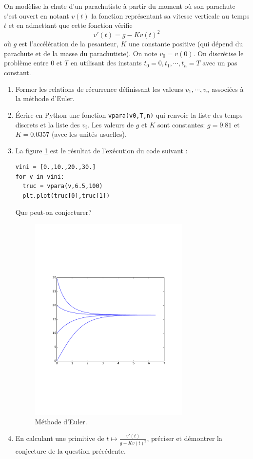 On modèlise la chute d'un parachutiste à partir du moment où son parachute s'est ouvert en notant $v(t)$ la fonction représentant sa vitesse verticale au temps $t$ et en admettant que cette fonction vérifie
\begin{displaymath}
  v'(t) = g - K v(t)^2
\end{displaymath}
où $g$ est l'accélération de la pesanteur, $K$ une constante positive (qui dépend du parachute et de la masse du parachutiste). On note $v_0=v(0)$.\newline
On discrétise le problème entre $0$ et $T$ en utilisant des instants $t_0=0,t_1,\cdots,t_n=T$ avec un pas constant.

\begin{enumerate}
  \item Former les relations de récurrence définissant les valeurs $v_1,\cdots,v_n$ associées à la méthode d'Euler.
  \item \'Ecrire en Python une fonction \texttt{vpara(v0,T,n)} qui renvoie la liste des temps discrets et la liste des $v_i$. Les valeurs de $g$ et $K$ sont constantes: $g=9.81$ et $K= 0.0357$ (avec les unités usuelles).
  \item La figure \ref{fig:Eeulerpara_1} est le résultat de l'exécution du code suivant :
\begin{verbatim}
vini = [0.,10.,20.,30.]
for v in vini:    
  truc = vpara(v,6.5,100)
  plt.plot(truc[0],truc[1])  
\end{verbatim}
Que peut-on conjecturer?
\begin{figure}[h]
  \centering
  \includegraphics[width=8cm]{./Eeulerpara_1_fig.pdf}
  \caption{Méthode d'Euler.}
  \label{fig:Eeulerpara_1}
\end{figure}

  \item En calculant une primitive de $t\mapsto \frac{v'(t)}{g-Kv(t)^2}$, préciser et démontrer la conjecture de la question précédente.
\end{enumerate}

